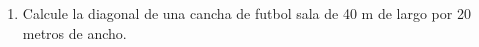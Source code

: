 \documentclass[fleqn]{article}
\begin{document}
\begin{enumerate}
\begin{enumerate}
 \end{enumerate}
 \item Calcule la diagonal de una cancha de futbol sala de 40 m de largo por 20 metros de ancho.\noanswer
 \end{enumerate}
\end{document}
